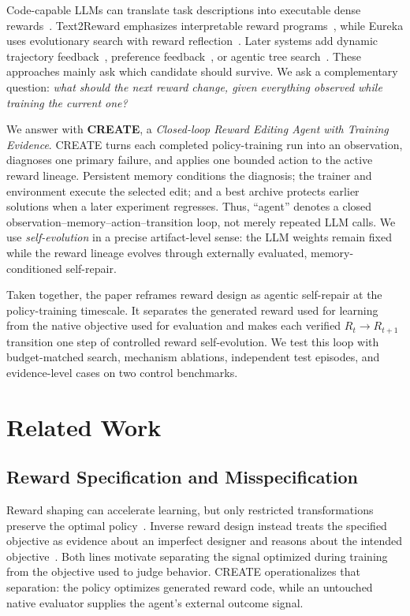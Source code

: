 \documentclass[conference]{IEEEtran}
\begin{document}
Code-capable LLMs can translate task descriptions into executable dense
rewards~\cite{language2rewards}. Text2Reward emphasizes interpretable reward
programs~\cite{text2reward}, while Eureka uses evolutionary search with reward
reflection~\cite{eureka}. Later systems add dynamic trajectory
feedback~\cite{card}, preference feedback~\cite{revolve}, or agentic tree
search~\cite{rfagent}. These
approaches mainly ask which candidate should survive. We ask a complementary
question: \emph{what should the next reward change, given everything observed
while training the current one?}

We answer with \textbf{CREATE}, a \emph{Closed-loop Reward Editing Agent with
Training Evidence}. CREATE turns each completed policy-training run into an
observation, diagnoses one primary failure, and applies one bounded action to
the active reward lineage. Persistent memory conditions the diagnosis; the
trainer and environment execute the selected edit; and a best archive protects
earlier solutions when a later experiment regresses. Thus, ``agent'' denotes a
closed observation--memory--action--transition loop, not merely repeated LLM
calls. We use \emph{self-evolution} in a precise artifact-level sense: the LLM
weights remain fixed while the reward lineage evolves through externally
evaluated, memory-conditioned self-repair.

Taken together, the paper reframes reward design as agentic self-repair at the
policy-training timescale. It separates the generated reward used for learning
from the native objective used for evaluation and makes each verified
$R_t\!\rightarrow\!R_{t+1}$ transition one step of controlled reward
self-evolution. We test this loop with budget-matched search, mechanism
ablations, independent test episodes, and evidence-level cases on two control
benchmarks.

\section{Related Work}
\subsection{Reward Specification and Misspecification}
Reward shaping can accelerate learning, but only restricted transformations
preserve the optimal policy~\cite{ng1999policy}. Inverse reward design instead
treats the specified objective as evidence about an imperfect designer and
reasons about the intended objective~\cite{hadfield2017inverse}. Both lines
motivate separating the signal optimized during training from the objective
used to judge behavior. CREATE operationalizes that separation: the policy
optimizes generated reward code, while an untouched native evaluator supplies
the agent's external outcome signal.
\end{document}
